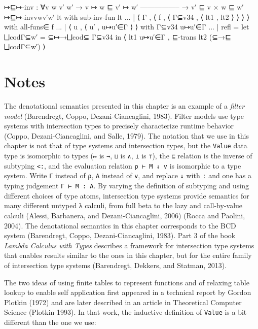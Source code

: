 \begin{fence}
\begin{code}
↦⊑↦-inv : ∀{v w v′ w′}
        → v ↦ w ⊑ v′ ↦ w′
          -----------------
        → v′ ⊑ v × w ⊑ w′
↦⊑↦-inv{v}{w}{v′}{w′} lt
    with sub-inv-fun lt
... | ⟨ Γ , ⟨ f , ⟨ Γ⊆v34 , ⟨ lt1 , lt2 ⟩ ⟩ ⟩ ⟩
    with all-funs∈ f
... | ⟨ u , ⟨ u′ , u↦u′∈Γ ⟩ ⟩
    with Γ⊆v34 u↦u′∈Γ
... | refl =
  let ⨆codΓ⊆w′ = ⊆↦→⨆cod⊆ Γ⊆v34 in
  ⟨ lt1 u↦u′∈Γ , ⊑-trans lt2 (⊆→⊑ ⨆codΓ⊆w′) ⟩
\end{code}
\end{fence}

\hypertarget{notes}{%
\section{Notes}\label{notes}}

The denotational semantics presented in this chapter is an example of a
\emph{filter model} (Barendregt, Coppo, Dezani-Ciancaglini, 1983).
Filter models use type systems with intersection types to precisely
characterize runtime behavior (Coppo, Dezani-Ciancaglini, and Salle,
1979). The notation that we use in this chapter is not that of type
systems and intersection types, but the \texttt{Value} data type is
isomorphic to types (\texttt{↦} is \texttt{→}, \texttt{⊔} is \texttt{∧},
\texttt{⊥} is \texttt{⊤}), the \texttt{⊑} relation is the inverse of
subtyping \texttt{\textless{}:}, and the evaluation relation
\texttt{ρ\ ⊢\ M\ ↓\ v} is isomorphic to a type system. Write \texttt{Γ}
instead of \texttt{ρ}, \texttt{A} instead of \texttt{v}, and replace
\texttt{↓} with \texttt{:} and one has a typing judgement
\texttt{Γ\ ⊢\ M\ :\ A}. By varying the definition of subtyping and using
different choices of type atoms, intersection type systems provide
semantics for many different untyped λ calculi, from full beta to the
lazy and call-by-value calculi (Alessi, Barbanera, and
Dezani-Ciancaglini, 2006) (Rocca and Paolini, 2004). The denotational
semantics in this chapter corresponds to the BCD system (Barendregt,
Coppo, Dezani-Ciancaglini, 1983). Part 3 of the book \emph{Lambda
Calculus with Types} describes a framework for intersection type systems
that enables results similar to the ones in this chapter, but for the
entire family of intersection type systems (Barendregt, Dekkers, and
Statman, 2013).

The two ideas of using finite tables to represent functions and of
relaxing table lookup to enable self application first appeared in a
technical report by Gordon Plotkin (1972) and are later described in an
article in Theoretical Computer Science (Plotkin 1993). In that work,
the inductive definition of \texttt{Value} is a bit different than the
one we use:

